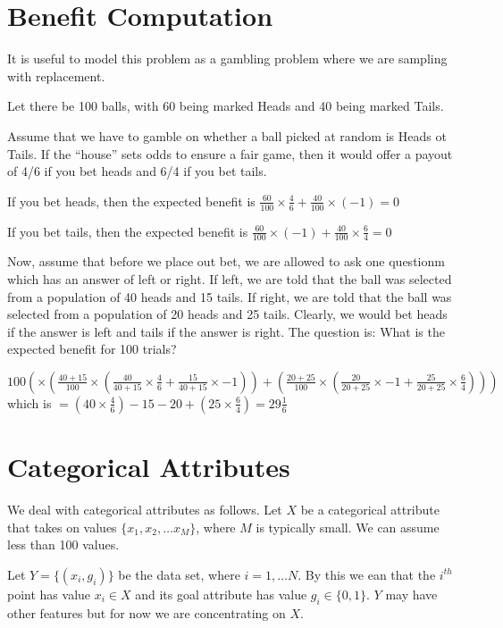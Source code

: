 \section{Benefit Computation}
It is useful to model this problem as a gambling problem where we are 
sampling with replacement. 
\bi
\item Let there be 100 balls, with 60  being marked Heads and 40
being marked Tails. 
\item Assume that we have to gamble on whether a ball picked at random is Heads
ot Tails. If the ``house'' sets odds to ensure a fair game, then it would offer
a payout of 4/6 if you bet heads and 6/4 if you bet tails. 
\item If you bet heads, then the expected benefit is 
\(\frac{60}{100} \times \frac{4}{6} + 
\frac{40}{100} \times (-1)  = 0\)
\item If you bet tails, then the expected benefit is 
\(\frac{60}{100} \times (-1) + 
\frac{40}{100} \times \frac{6}{4}  = 0\)
\ei

Now, assume that before we place out bet, we are allowed to ask one questionm
which has an answer of left or right. If left, we are told that the ball was
selected from a population of 40 heads and 15 tails. If right, we are told that
the ball was selected from a population of 20 heads and 25 tails. Clearly, we
would bet heads if the answer is left and tails if the answer is right. The
question is: What is the expected benefit for 100 trials?

\(100 ( \times ( \frac{40+15}{100} \times ( 
  \frac{40}{40+15} \times \frac{4}{6}  + 
  \frac{15}{40+15} \times -1 ) ) + 
  ( \frac{20+25}{100} \times ( 
  \frac{20}{20+25} \times -1 + 
  \frac{25}{20+25} \times \frac{6}{4}  ) ) )
  \)
which is \(
 = (40 \times  \frac{4}{6}) -15 - 20 + (25 \times \frac{6}{4} )
 = 29 \frac{1}{6}\)

\section{Categorical Attributes}
We deal with categorical attributes as follows. Let \(X\) be a categorical
attribute that takes on values \(\{x_1, x_2, \ldots x_M\}\), where \(M\) is
typically small. We can assume less than 100 values.

Let \(Y = \{(x_i, g_i)\}\) be the data set, where \(i = 1, \ldots N\). 
By this we ean
that the \(i^{th}\) point has value \(x_i \in X\) and its goal attribute has
value \(g_i \in \{0, 1\}\). 
\(Y\) may have other features but for now we are concentrating on \(X\).

